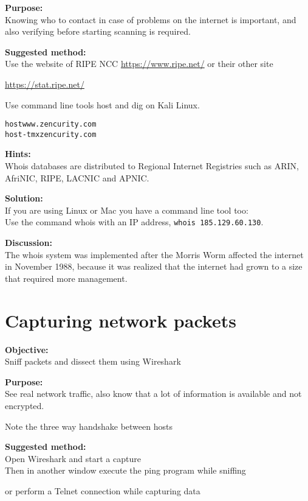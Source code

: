 \documentclass[a4paper,11pt,notitlepage]{report}
\begin{document}
{\bf Purpose:}\\
Knowing who to contact in case of problems on the internet is important, and also verifying before starting scanning is required.

{\bf Suggested method:}\\
Use the website of RIPE NCC \url{https://www.ripe.net/} or their other site

\url{https://stat.ripe.net/}

Use command line tools host and dig on Kali Linux.
\begin{alltt}
host www.zencurity.com
host -t mx zencurity.com
\end{alltt}

{\bf Hints:}\\
Whois databases are distributed to Regional Internet Registries such as ARIN, AfriNIC, RIPE, LACNIC and APNIC.

{\bf Solution:}\\
If you are using Linux or Mac you have a command line tool too:\\
Use the command whois with an IP address, \verb+whois 185.129.60.130+.

{\bf Discussion:}\\
The whois system was implemented after the Morris Worm affected the internet in November 1988, because it was realized that the internet had grown to a size that required more management.


\chapter{Capturing network packets}
\label{ex:wireshark-capture}



{\bf Objective:}\\
Sniff packets and dissect them using Wireshark

{\bf Purpose:}\\
See real network traffic, also know that a lot of information is available and not encrypted.

Note the three way handshake between hosts

{\bf Suggested method:}\\
Open Wireshark and start a capture\\
Then in another window execute the ping program while sniffing

or perform a Telnet connection while capturing data
\end{document}

